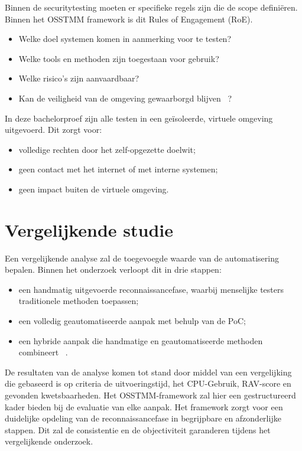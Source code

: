 Binnen de securitytesting moeten er specifieke regels zijn die de scope definiëren. Binnen het OSSTMM framework is dit Rules of Engagement (RoE).

\begin{itemize}
  \item Welke doel systemen komen in aanmerking voor te testen?
  \item Welke tools en methoden zijn toegestaan voor gebruik?
  \item Welke risico's zijn aanvaardbaar? 
  \item Kan de veiligheid van de omgeving gewaarborgd blijven ~\autocite{Herzog}?
\end{itemize}

In deze bachelorproef zijn alle testen in een geïsoleerde, virtuele omgeving uitgevoerd. Dit zorgt voor:

\begin{itemize}
  \item volledige rechten door het zelf-opgezette doelwit;
  \item geen contact met het internet of met interne systemen;
  \item geen impact buiten de virtuele omgeving.
\end{itemize}



\section{Vergelijkende studie}

Een vergelijkende analyse zal de toegevoegde waarde van de automatisering bepalen. Binnen het onderzoek verloopt dit in drie stappen:

\begin{itemize}
    \item een handmatig uitgevoerde reconnaissancefase, waarbij menselijke testers traditionele methoden toepassen;
    \item een volledig geautomatiseerde aanpak met behulp van de PoC;
    \item een hybride aanpak die handmatige en geautomatiseerde methoden combineert ~\autocite{Herzog}.
\end{itemize}

De resultaten van de analyse komen tot stand door middel van een vergelijking die gebaseerd is op criteria de uitvoeringstijd, het CPU-Gebruik, RAV-score en gevonden kwetsbaarheden.
Het OSSTMM-framework zal hier een gestructureerd kader bieden bij de evaluatie van elke aanpak. Het framework zorgt voor een duidelijke opdeling van de reconnaissancefase in begrijpbare en afzonderlijke stappen. Dit zal de consistentie en de objectiviteit garanderen tijdens het vergelijkende onderzoek.





